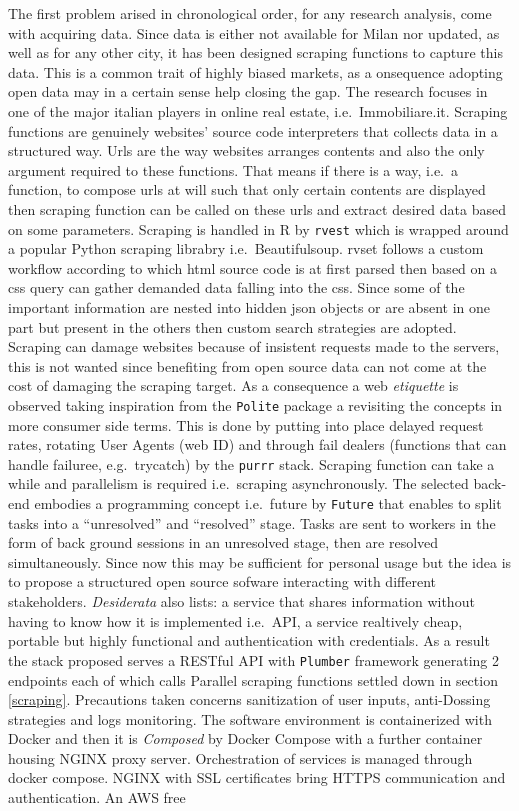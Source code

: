 \documentclass[
  12pt,
  a4paper,
  oneside]{book}
\newcommand{\passthrough}[1]{#1}
\theoremstyle{definition}
\theoremstyle{definition}
\theoremstyle{definition}
\theoremstyle{remark}
\begin{document}
The first problem arised in chronological order, for any research analysis, come with acquiring data. Since data is either not available for Milan nor updated, as well as for any other city, it has been designed scraping functions to capture this data. This is a common trait of highly biased markets, as a onsequence adopting open data may in a certain sense help closing the gap. The research focuses in one of the major italian players in online real estate, i.e.~Immobiliare.it. Scraping functions are genuinely websites' source code interpreters that collects data in a structured way. Urls are the way websites arranges contents and also the only argument required to these functions. That means if there is a way, i.e.~a function, to compose urls at will such that only certain contents are displayed then scraping function can be called on these urls and extract desired data based on some parameters. Scraping is handled in R by \passthrough{\lstinline!rvest!} which is wrapped around a popular Python scraping librabry i.e.~Beautifulsoup. rvset follows a custom workflow according to which html source code is at first parsed then based on a css query can gather demanded data falling into the css. Since some of the important information are nested into hidden json objects or are absent in one part but present in the others then custom search strategies are adopted. Scraping can damage websites because of insistent requests made to the servers, this is not wanted since benefiting from open source data can not come at the cost of damaging the scraping target. As a consequence a web \emph{etiquette} is observed taking inspiration from the \passthrough{\lstinline!Polite!} package a revisiting the concepts in more consumer side terms. This is done by putting into place delayed request rates, rotating User Agents (web ID) and through fail dealers (functions that can handle failuree, e.g.~trycatch) by the \passthrough{\lstinline!purrr!} stack. Scraping function can take a while and parallelism is required i.e.~scraping asynchronously. The selected back-end embodies a programming concept i.e.~future by \passthrough{\lstinline!Future!} that enables to split tasks into a ``unresolved'' and ``resolved'' stage. Tasks are sent to workers in the form of back ground sessions in an unresolved stage, then are resolved simultaneously. Since now this may be sufficient for personal usage but the idea is to propose a structured open source sofware interacting with different stakeholders. \emph{Desiderata} also lists: a service that shares information without having to know how it is implemented i.e.~API, a service realtively cheap, portable but highly functional and authentication with credentials. As a result the stack proposed serves a RESTful API with \passthrough{\lstinline!Plumber!} framework generating 2 endpoints each of which calls Parallel scraping functions settled down in section \ref{scraping}. Precautions taken concerns sanitization of user inputs, anti-Dossing strategies and logs monitoring. The software environment is containerized with Docker and then it is \emph{Composed} by Docker Compose with a further container housing NGINX proxy server. Orchestration of services is managed through docker compose. NGINX with SSL certificates bring HTTPS communication and authentication. An AWS free 
\end{document}
